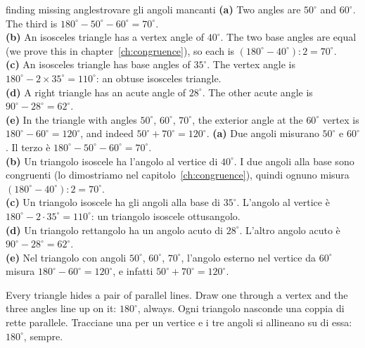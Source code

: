 \documentclass[10pt,a4paper,oneside]{book}
\begin{document}
\begin{example}{finding missing angles}{trovare gli angoli mancanti}
\textbf{(a)} Two angles are $50^\circ$ and $60^\circ$. The third is $180^\circ - 50^\circ - 60^\circ = 70^\circ$.\\
\textbf{(b)} An isosceles triangle has a vertex angle of $40^\circ$. The two base angles are equal (we prove this in chapter~\ref{ch:congruence}), so each is $(180^\circ - 40^\circ) : 2 = 70^\circ$.\\
\textbf{(c)} An isosceles triangle has base angles of $35^\circ$. The vertex angle is $180^\circ - 2 \times 35^\circ = 110^\circ$: an obtuse isosceles triangle.\\
\textbf{(d)} A right triangle has an acute angle of $28^\circ$. The other acute angle is $90^\circ - 28^\circ = 62^\circ$.\\
\textbf{(e)} In the triangle with angles $50^\circ$, $60^\circ$, $70^\circ$, the exterior angle at the $60^\circ$ vertex is $180^\circ - 60^\circ = 120^\circ$, and indeed $50^\circ + 70^\circ = 120^\circ$.
\tcblower
\textbf{(a)} Due angoli misurano $50^\circ$ e $60^\circ$. Il terzo è $180^\circ - 50^\circ - 60^\circ = 70^\circ$.\\
\textbf{(b)} Un triangolo isoscele ha l'angolo al vertice di $40^\circ$. I due angoli alla base sono congruenti (lo dimostriamo nel capitolo~\ref{ch:congruence}), quindi ognuno misura $(180^\circ - 40^\circ) : 2 = 70^\circ$.\\
\textbf{(c)} Un triangolo isoscele ha gli angoli alla base di $35^\circ$. L'angolo al vertice è $180^\circ - 2 \cdot 35^\circ = 110^\circ$: un triangolo isoscele ottusangolo.\\
\textbf{(d)} Un triangolo rettangolo ha un angolo acuto di $28^\circ$. L'altro angolo acuto è $90^\circ - 28^\circ = 62^\circ$.\\
\textbf{(e)} Nel triangolo con angoli $50^\circ$, $60^\circ$, $70^\circ$, l'angolo esterno nel vertice da $60^\circ$ misura $180^\circ - 60^\circ = 120^\circ$, e infatti $50^\circ + 70^\circ = 120^\circ$.
\end{example}

\begin{keyidea}{}{}
Every triangle hides a pair of parallel lines. Draw one through a vertex and the three angles line up on it: $180^\circ$, always.
\tcblower
Ogni triangolo nasconde una coppia di rette parallele. Tracciane una per un vertice e i tre angoli si allineano su di essa: $180^\circ$, sempre.
\end{keyidea}
\end{document}

